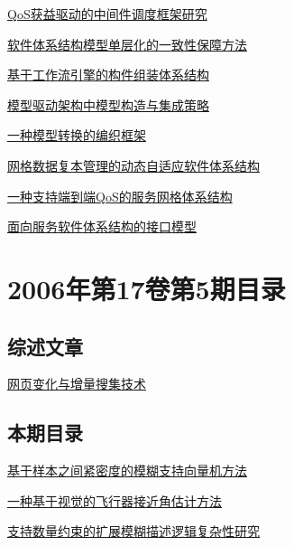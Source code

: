 \documentclass[a4paper]{article}
\begin{document}
\href{http://www.jos.org.cn/ch/reader/download_pdf.aspx?file_no=20060613&year_id=2006&quarter_id=6&falg=1}{QoS获益驱动的中间件调度框架研究}

\href{http://www.jos.org.cn/ch/reader/download_pdf.aspx?file_no=20060614&year_id=2006&quarter_id=6&falg=1}{软件体系结构模型单层化的一致性保障方法}

\href{http://www.jos.org.cn/ch/reader/download_pdf.aspx?file_no=20060615&year_id=2006&quarter_id=6&falg=1}{基于工作流引擎的构件组装体系结构}

\href{http://www.jos.org.cn/ch/reader/download_pdf.aspx?file_no=20060616&year_id=2006&quarter_id=6&falg=1}{模型驱动架构中模型构造与集成策略}

\href{http://www.jos.org.cn/ch/reader/download_pdf.aspx?file_no=20060617&year_id=2006&quarter_id=6&falg=1}{一种模型转换的编织框架}

\href{http://www.jos.org.cn/ch/reader/download_pdf.aspx?file_no=20060618&year_id=2006&quarter_id=6&falg=1}{网格数据复本管理的动态自适应软件体系结构}

\href{http://www.jos.org.cn/ch/reader/download_pdf.aspx?file_no=20060619&year_id=2006&quarter_id=6&falg=1}{一种支持端到端QoS的服务网格体系结构}

\href{http://www.jos.org.cn/ch/reader/download_pdf.aspx?file_no=20060620&year_id=2006&quarter_id=6&falg=1}{面向服务软件体系结构的接口模型}


\section{\textbf{2006年第17卷第5期目录}}
\subsection{综述文章}
\href{http://www.jos.org.cn/ch/reader/download_pdf.aspx?file_no=20060513&year_id=2006&quarter_id=5&falg=1}{网页变化与增量搜集技术}

\subsection{本期目录}
\href{http://www.jos.org.cn/ch/reader/download_pdf.aspx?file_no=20060501&year_id=2006&quarter_id=5&falg=1}{基于样本之间紧密度的模糊支持向量机方法}

\href{http://www.jos.org.cn/ch/reader/download_pdf.aspx?file_no=20060502&year_id=2006&quarter_id=5&falg=1}{一种基于视觉的飞行器接近角估计方法}

\href{http://www.jos.org.cn/ch/reader/download_pdf.aspx?file_no=20060503&year_id=2006&quarter_id=5&falg=1}{支持数量约束的扩展模糊描述逻辑复杂性研究}
\end{document}
